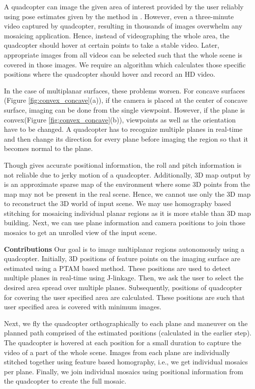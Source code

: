 A quadcopter can image the given area of interest provided by the user reliably
using pose estimates given by the method in \cite{engel}. However, even a
three-minute video captured by quadcopter, resulting in thousands of images
overwhelm any mosaicing application. Hence, instead of videographing the whole
area, the quadcopter should hover at certain points to take a stable video.
Later, appropriate images from all videos can be selected such that the whole
scene is covered in those images. We require an algorithm which calculates
those specific positions  where the quadcopter should hover and record an HD
video.

In the case of multiplanar surfaces, these problems worsen. For concave
surfaces (Figure \ref{fig:convex_concave}(a)), if the camera is placed at the
center of concave surface, imaging can be done from the single viewpoint.
However, if the plane is convex(Figure \ref{fig:convex_concave}(b)), viewpoints
as well as the orientation have to be changed. A quadcopter has to recognize
multiple planes in real-time and then change its direction for every plane before imaging the
region so that it becomes normal to the plane.

Though \cite{engel} gives accurate positional information, the roll and
pitch information is not reliable due to jerky motion of a quadcopter.
Additionally, 3D map output by \cite{engel} is an approximate sparse map of the
environment where some 3D points from the map may not be present in the real
scene. Hence, we cannot use only the 3D map to reconstruct the 3D world of input
scene. We may use homography based stitching for mosaicing individual planar
regions as it is more stable than 3D map building. Next, we can use plane
information and camera positions to join those mosaics to get an unrolled view
of the input scene.

\textbf{Contributions}
Our goal is to image multiplanar regions autonomously using a quadcopter. Initially,
3D positions of feature points on the imaging surface are estimated using a PTAM
based method. These positions are used to detect multiple planes in real-time
using J-linkage. Then, we ask the user to select the desired area spread over
multiple planes. Subsequently, positions of quadcopter for covering the user specified
area are calculated. These positions are such that user specified area is
covered with minimum images. 

Next, we fly the quadcopter orthographically to each plane and maneuver on
the planned path comprised of the estimated positions (calculated in the earlier
step). The quadcopter is hovered at each position for a small duration to capture the
video of a part of the whole scene. Images from each plane are individually stitched together
using feature based homography, i.e., we get individual mosaics per plane. Finally, we join
individual mosaics using positional information from the quadcopter to create the full mosaic.

